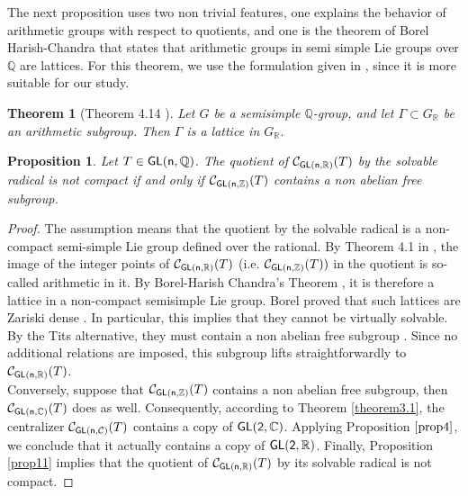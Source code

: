 \documentclass[a4paper,11pt]{article}
\newtheorem{theorem}{Theorem}[section]
\newtheorem{proposition}{Proposition}[section]
\theoremstyle{definition}
\newcommand{\Z}{\mathbb Z}
\newcommand{\Q}{\mathbb Q}
\newcommand{\C}{\mathcal C}
\newcommand{\R}{\mathbb R}
\def \GL{\sf{GL}}
\begin{document}
The next proposition uses two non trivial features, one explains the behavior of arithmetic groups with respect to quotients, and one is the theorem of Borel Harish-Chandra \cite{borel1962arithmetic} that states that arithmetic groups in semi simple Lie groups over $\Q$ are lattices.  For this theorem, we use the formulation given in \cite{platonov1993algebraic}, since it is more suitable for our study.

\begin{theorem}[Theorem 4.14 \cite{platonov1993algebraic}]
Let $G$ be a semisimple $\Q$-group, and let $\Gamma \subset G_\R$ be an arithmetic subgroup. Then $\Gamma$ is a lattice in $G_\R$.
    
\end{theorem}

\begin{proposition}\label{prop13}
Let $T\in \GL(n,\Q)$. The quotient of $\C_{\GL(n,\R)} (T)$  by the solvable radical is not compact if and only if   
$\C_{\GL(n,\Z)} (T) $ contains a non abelian free subgroup.
\end{proposition}

\begin{proof}


The assumption means that the quotient by the solvable radical
is a non-compact semi-simple Lie group defined over the rational. By
Theorem 4.1 in \cite{platonov1993algebraic}, the image of the integer points of
$\C_{\GL(n,\R)} (T) $ (i.e. $ \C_{\GL(n,\Z)} (T))$ in the quotient is so-called arithmetic in it. By
Borel-Harish Chandra's Theorem \cite{borel1962arithmetic}, it is therefore a lattice in a non-compact semisimple Lie
group. Borel proved that such lattices are Zariski dense \cite{borel1960density}. In particular, this implies that they cannot be virtually solvable. By the Tits alternative, they must contain a non abelian free subgroup \cite{tits1972free}. Since no additional relations are imposed, this subgroup lifts straightforwardly to $\C_{\GL(n,\R)}(T)$. \\
Conversely, suppose that $\C_{\GL(n,\Z)}(T)$ contains a non abelian free subgroup, then $\C_{\GL(n,\mathbb{C})}(T)$ does as well. Consequently, according to Theorem \ref{theorem3.1}, the centralizer $\C_{\GL(n,\C)}(T)$ contains a copy of $\GL(2,\mathbb{C})$. Applying Proposition $\ref{prop4}$, we conclude that it actually contains a copy of $\GL(2,\R)$. Finally, Proposition \ref{prop11} implies that the quotient of $\C_{\GL(n,\R)}(T)$ by its solvable radical is not compact. 

\end{proof}
\end{document}
